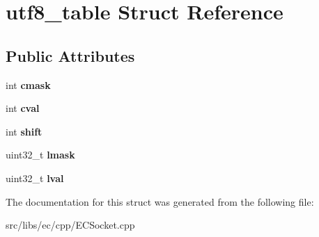 \section{utf8\_\-table Struct Reference}
\label{structutf8__table}
\subsection*{Public Attributes}
\begin{DoxyCompactItemize}
\item 
int {\bfseries cmask}\label{structutf8__table_a3b5a2ab01b7cec92681a6067e1fec202}

\item 
int {\bfseries cval}\label{structutf8__table_ac16a9da1e7aca56a8b0f68cda20d7d3d}

\item 
int {\bfseries shift}\label{structutf8__table_ae8ec16819170e356a0d1a989560084e2}

\item 
uint32\_\-t {\bfseries lmask}\label{structutf8__table_add50434d5eaf9ce0d87060c3d4fe73e6}

\item 
uint32\_\-t {\bfseries lval}\label{structutf8__table_a104f76178d52b1b047e88b93b0d4a33c}

\end{DoxyCompactItemize}


The documentation for this struct was generated from the following file:\begin{DoxyCompactItemize}
\item 
src/libs/ec/cpp/ECSocket.cpp\end{DoxyCompactItemize}
